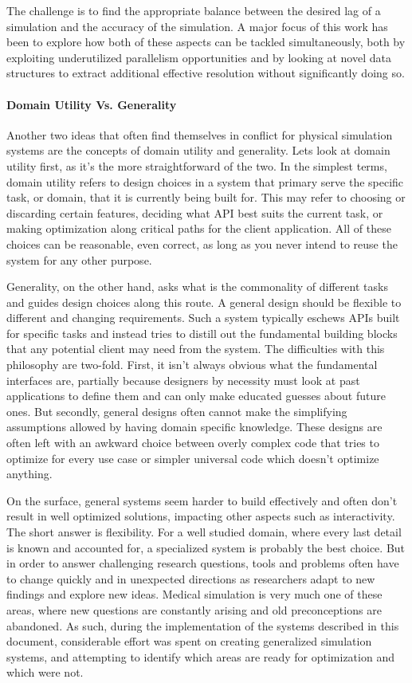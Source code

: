 The challenge is to find the appropriate balance between the desired
lag of a simulation and the accuracy of the simulation. A major
focus of this work has been to explore how both of these aspects can be
tackled simultaneously, both by exploiting underutilized parallelism
opportunities and by looking at novel data structures to extract
additional effective resolution without significantly doing so.
  
\paragraph{Domain Utility Vs. Generality}

Another two ideas that often find themselves in conflict for
physical simulation systems are the concepts of domain utility and
generality. Lets look at domain utility first, as it's the more
straightforward of the two. In the simplest terms, domain utility
refers to design choices in a system that primary serve the
specific task, or domain, that it is currently being built for. This
may refer to choosing or discarding certain features, deciding what
API best suits the current task, or making optimization along critical
paths for the client application. All of these choices can be
reasonable, even correct, as long as you never intend to reuse the
system for any other purpose.

Generality, on the other hand, asks what is the commonality of
different tasks and guides design choices along this route. A general
design should be flexible to different and changing requirements. Such
a system typically eschews APIs built for specific tasks and instead
tries to distill out the fundamental building blocks that any
potential client may need from the system. The difficulties with this
philosophy are two-fold. First, it isn't always obvious what the
fundamental interfaces are, partially because designers by necessity
must look at past applications to define them and can only make
educated guesses about future ones. But secondly, general designs
often cannot make the simplifying assumptions allowed by having domain
specific knowledge. These designs are often left with an awkward choice
between overly complex code that tries to optimize for every use case
or simpler universal code which doesn't optimize anything.

On the surface, general systems seem harder to build effectively and
often don't result in well optimized solutions, impacting other
aspects such as interactivity. The short answer is flexibility. For a
well studied domain, where every last detail is known and accounted
for, a specialized system is probably the best choice. But in order to
answer challenging research questions, tools and problems often have
to change quickly and in unexpected directions as researchers adapt to new
findings and explore new ideas. Medical simulation is very much
one of these areas, where new questions are constantly arising and old
preconceptions are abandoned. As such, during the implementation of
the systems described in this document, considerable effort was spent
on creating generalized simulation systems, and attempting to identify
which areas are ready for optimization and which were not.


